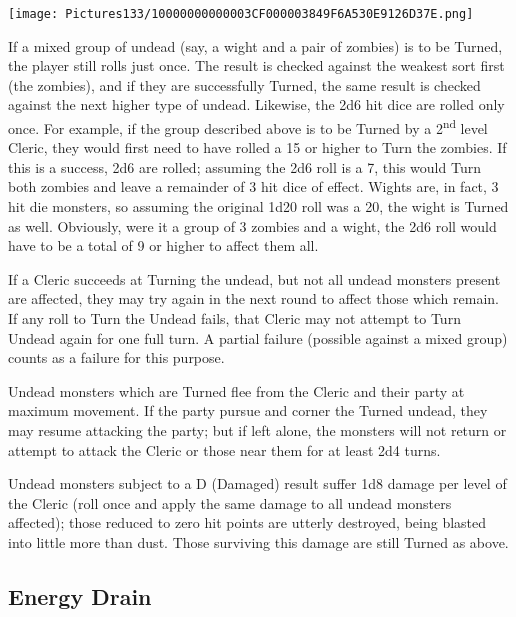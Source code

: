 \documentclass[a4paper,twoside,openany,10pt]{book}
\begin{document}
\begin{multicols}{2}
	

\begin{flushleft}
	\texttt{[image: Pictures133/10000000000003CF000003849F6A530E9126D37E.png]}
\end{flushleft}

If a mixed group of undead (say, a wight and a pair of zombies) is to be Turned, the player still rolls just once. The result is checked against the weakest sort first (the zombies), and if they are successfully Turned, the same result is checked against the next higher type of undead. Likewise, the 2d6 hit dice are rolled only once. For example, if the group described above is to be Turned by a 2\textsuperscript{nd} level Cleric, they would first need to have rolled a 15 or higher to Turn the zombies. If this is a success, 2d6 are rolled; assuming the 2d6 roll is a 7, this would Turn both zombies and leave a remainder of 3 hit dice of effect. Wights are, in fact, 3 hit die monsters, so assuming the original 1d20 roll was a 20, the wight is Turned as well. Obviously, were it a group of 3 zombies and a wight, the 2d6 roll would have to be a total of 9 or higher to affect them all.

If a Cleric succeeds at Turning the undead, but not all undead monsters present are affected, they may try again in the next round to affect those which remain. If any roll to Turn the Undead fails, that Cleric may not attempt to Turn Undead again for one full turn. A partial failure (possible against a mixed group) counts as a failure for this purpose.

Undead monsters which are Turned flee from the Cleric and their party at maximum movement. If the party pursue and corner the Turned undead, they may resume attacking the party; but if left alone, the monsters will not return or attempt to attack the Cleric or those near them for at least 2d4 turns.

Undead monsters subject to a D (Damaged) result suffer 1d8 damage per level of the Cleric (roll once and apply the same damage to all undead monsters affected); those reduced to zero hit points are utterly destroyed, being blasted into little more than dust. Those surviving this damage are still Turned as above.

\subsection{Energy Drain}\label{energy-drain}


\end{multicols}
\end{document}
